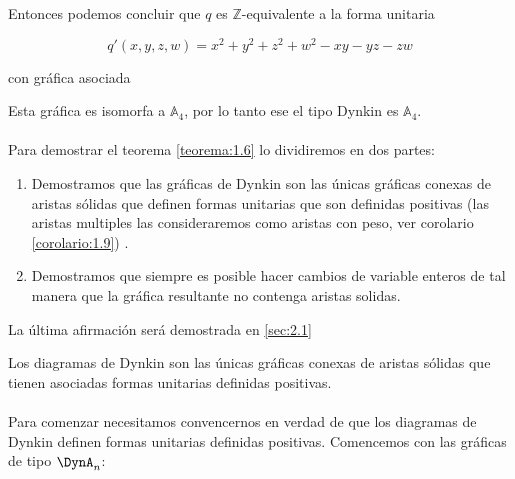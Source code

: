 \begin{example}
Entonces podemos concluir que $q$ es $\mathbb{Z}$-equivalente a la forma unitaria

\begin{equation*}
q'\left(x, y, z, w\right) = x^{2} + y^{2} + z^{2} + w^{2} - xy - yz - zw
\end{equation*}

con gráfica asociada

\begin{center}
\end{center}

Esta gráfica es isomorfa a $\mathbb{A}_{4}$, por lo tanto ese el tipo Dynkin es $\mathbb{A}_{4}$.
\end{example}

\paragraph{}
Para demostrar el teorema \ref{teorema:1.6} lo dividiremos en dos partes:

\begin{enumerate}
    \item Demostramos que las gráficas de Dynkin son las únicas gráficas conexas de aristas sólidas que definen formas unitarias que son definidas positivas (las aristas multiples las consideraremos como aristas con peso, ver corolario \ref{corolario:1.9}) .
    \item Demostramos que siempre es posible hacer cambios de variable enteros de tal manera que la gráfica resultante no contenga aristas solidas.
\end{enumerate}

La última afirmación será demostrada en \ref{sec:2.1}

\begin{lemma}
Los diagramas de Dynkin son las únicas gráficas conexas de aristas sólidas que tienen asociadas formas unitarias definidas positivas.
\label{lema:1.7}
\end{lemma}

\paragraph{}
Para comenzar necesitamos convencernos en verdad de que los diagramas de Dynkin definen formas unitarias definidas positivas. Comencemos con las gráficas de tipo $\DynA_{n}$:

